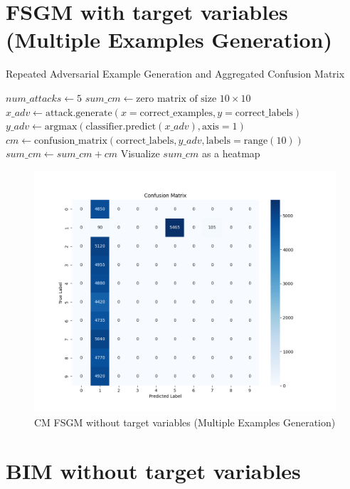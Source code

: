 \documentclass[11pt,onside]{article}
\begin{document}
\section{FSGM with target variables (Multiple Examples Generation)}
\begin{algorithm}[H]
\caption{Repeated Adversarial Example Generation and Aggregated Confusion Matrix}
\begin{algorithmic}[1]
\State $num\_attacks \gets 5$
\State $sum\_cm \gets \text{zero matrix of size } 10 \times 10$
    \State $x\_adv \gets \text{attack.generate}(x=\text{correct\_examples}, y=\text{correct\_labels})$
    \State $y\_adv \gets \text{argmax}(\text{classifier.predict}(x\_adv), \text{axis}=1)$
    \State $cm \gets \text{confusion\_matrix}(\text{correct\_labels}, y\_adv, \text{labels}=\text{range}(10))$
    \State $sum\_cm \gets sum\_cm + cm$
\EndFor
\State Visualize $sum\_cm$ as a heatmap
\end{algorithmic}
\end{algorithm}

\begin{figure}[h]
\centering
\includegraphics[width=1\textwidth]{V1_images/mul_attacks_FGM_with_target.png}
\caption{CM FSGM without target variables (Multiple Examples Generation)}
\label{fig:FSGM with target variables (Multiple Examples Generation)}
\end{figure}



\section{BIM without target variables}
\end{document}
